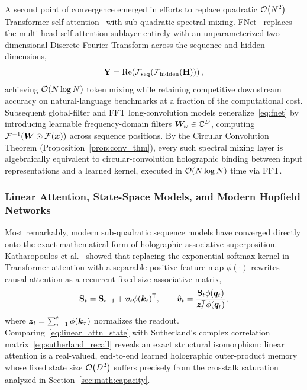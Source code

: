 A second point of convergence emerged in efforts to replace quadratic $\mathcal{O}\!\left(N^2\right)$ Transformer self-attention~\cite{VASWANI_TRANSFORMER} with sub-quadratic spectral mixing.
FNet~\cite{LEE_THORP_FNET} replaces the multi-head self-attention sublayer entirely with an unparameterized two-dimensional Discrete Fourier Transform across the sequence and hidden dimensions,
\begin{equation}\label{eq:fnet}
    \mathbf{Y} = \operatorname{Re}\!\left(\mathcal{F}_{\mathrm{seq}}\!\left(\mathcal{F}_{\mathrm{hidden}}(\mathbf{H})\right)\right),
\end{equation}
achieving $\mathcal{O}\!\left(N \log N\right)$ token mixing while retaining competitive downstream accuracy on natural-language benchmarks at a fraction of the computational cost.
Subsequent global-filter and FFT long-convolution models generalize~\eqref{eq:fnet} by introducing learnable frequency-domain filters $\boldsymbol{W}_\omega \in \mathbb{C}^D$, computing $\mathcal{F}^{-1}(\boldsymbol{W} \odot \mathcal{F}(\boldsymbol{x}))$ across sequence positions.
By the Circular Convolution Theorem (Proposition~\ref{prop:conv_thm}), every such spectral mixing layer is algebraically equivalent to circular-convolution holographic binding between input representations and a learned kernel, executed in $\mathcal{O}\!\left(N \log N\right)$ time via FFT.

\subsubsection{Linear Attention, State-Space Models, and Modern Hopfield Networks}

Most remarkably, modern sub-quadratic sequence models have converged directly onto the exact mathematical form of holographic associative superposition.
Katharopoulos et al.~\cite{KATHAROPOULOS_2020_LINEAR_TRANSFORMER} showed that replacing the exponential softmax kernel in Transformer attention with a separable positive feature map $\phi(\cdot)$ rewrites causal attention as a recurrent fixed-size associative matrix,
\begin{equation}\label{eq:linear_attn_state}
    \mathbf{S}_t = \mathbf{S}_{t-1} + \boldsymbol{v}_t \phi(\boldsymbol{k}_t)^{\mathsf{T}},
    \qquad
    \hat{\boldsymbol{v}}_t = \frac{\mathbf{S}_t \phi(\boldsymbol{q}_t)}{\boldsymbol{z}_t^{\mathsf{T}} \phi(\boldsymbol{q}_t)},
\end{equation}
where $\boldsymbol{z}_t = \sum_{\tau=1}^{t} \phi(\boldsymbol{k}_\tau)$ normalizes the readout.
Comparing~\eqref{eq:linear_attn_state} with Sutherland's complex correlation matrix~\eqref{eq:sutherland_recall} reveals an exact structural isomorphism: linear attention is a real-valued, end-to-end learned holographic outer-product memory whose fixed state size $\mathcal{O}\!\left(D^2\right)$ suffers precisely from the crosstalk saturation analyzed in Section~\ref{sec:math:capacity}.

